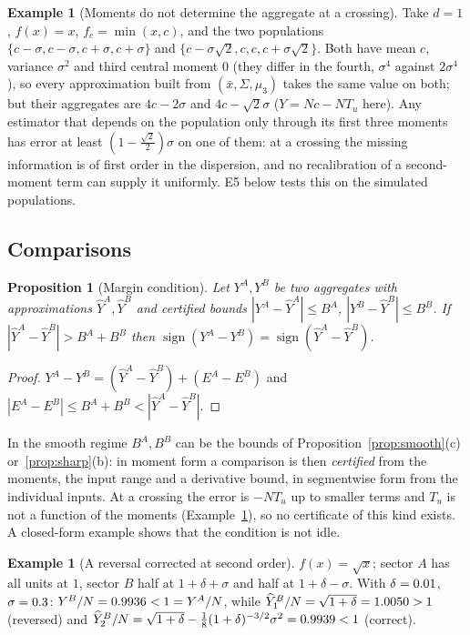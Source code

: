 \documentclass[10pt,a4paper]{article}
\theoremstyle{plain}
\newtheorem{proposition}[theorem]{Proposition}
\theoremstyle{definition}
\newtheorem{example}[theorem]{Example}
\theoremstyle{remark}
\newcommand{\Yh}{\widehat{Y}}
\newcommand{\Tu}{T_u}
\begin{document}
\begin{example}[Moments do not determine the aggregate at a crossing]\label{ex:moments}
Take $d=1$, $f(x)=x$, $f_c=\min(x,c)$, and the two populations $\{c-\sigma,c-\sigma,c+\sigma,c+\sigma\}$ and $\{c-\sigma\sqrt2,c,c,c+\sigma\sqrt2\}$. Both have mean $c$, variance $\sigma^2$ and third central moment $0$ (they differ in the fourth, $\sigma^4$ against $2\sigma^4$), so every approximation built from $(\bar x,\Sigma,\mu_3)$ takes the same value on both; but their aggregates are $4c-2\sigma$ and $4c-\sqrt2\sigma$ ($Y=Nc-N\Tu$ here). Any estimator that depends on the population only through its first three moments has error at least $(1-\tfrac{\sqrt2}{2})\sigma$ on one of them: at a crossing the missing information is of first order in the dispersion, and no recalibration of a second-moment term can supply it uniformly. E5 below tests this on the simulated populations.
\end{example}

\subsection{Comparisons}

\begin{proposition}[Margin condition]\label{prop:margin}
Let $Y^A,Y^B$ be two aggregates with approximations $\Yh^A,\Yh^B$ and certified bounds $|Y^A-\Yh^A|\le B^A$, $|Y^B-\Yh^B|\le B^B$. If $|\Yh^A-\Yh^B|>B^A+B^B$ then $\operatorname{sign}(Y^A-Y^B)=\operatorname{sign}(\Yh^A-\Yh^B)$.
\end{proposition}
\begin{proof}
$Y^A-Y^B=(\Yh^A-\Yh^B)+(E^A-E^B)$ and $|E^A-E^B|\le B^A+B^B<|\Yh^A-\Yh^B|$.
\end{proof}

In the smooth regime $B^A,B^B$ can be the bounds of Proposition~\ref{prop:smooth}(c) or~\ref{prop:sharp}(b): in moment form a comparison is then \emph{certified} from the moments, the input range and a derivative bound, in segmentwise form from the individual inputs. At a crossing the error is $-N\Tu$ up to smaller terms and $\Tu$ is not a function of the moments (Example~\ref{ex:moments}), so no certificate of this kind exists. A closed-form example shows that the condition is not idle.

\begin{example}[A reversal corrected at second order]\label{ex:rev}
$f(x)=\sqrt x$; sector $A$ has all units at $1$, sector $B$ half at $1+\delta+\sigma$ and half at $1+\delta-\sigma$. With $\delta=0.01$, $\sigma=0.3$: $Y^B/N=0.9936<1=Y^A/N$, while $\Yh_1^B/N=\sqrt{1+\delta}=\EsixSqrtYoneB>1$ (reversed) and $\Yh_2^B/N=\sqrt{1+\delta}-\tfrac18(1+\delta)^{-3/2}\sigma^2=\EsixSqrtYtwoB<1$ (correct).
\end{example}
\end{document}
